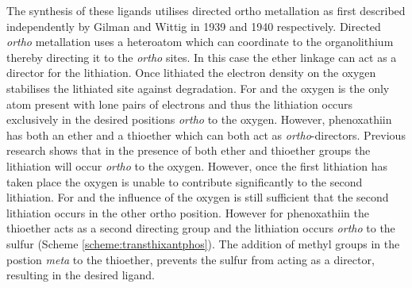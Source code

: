 {The synthesis of these ligands utilises directed ortho metallation as first described independently by Gilman and Wittig in 1939 and 1940 respectively.\cite{Gilman1939, Wittig1940} Directed \emph{ortho} metallation uses a heteroatom which can coordinate to the organolithium thereby directing it to the \emph{ortho} sites.  In this case the ether linkage can act as a director for the lithiation.  Once lithiated the electron density on the oxygen stabilises the lithiated site against degradation.  For \tBuxantphos{} and \tBusixantphos{} the oxygen is the only atom present with lone pairs of electrons and thus the lithiation occurs exclusively in the desired positions \emph{ortho} to the oxygen.  However, phenoxathiin has both an ether and a thioether which can both act as \emph{ortho}-directors.\cite{Organolithiummethods}  Previous research shows that in the presence of both ether and thioether groups the lithiation will occur \emph{ortho} to the oxygen.\cite{Turck1997}  However, once the first lithiation has taken place the oxygen is unable to contribute significantly to the second lithiation.  For \tBuxantphos{} and \tBusixantphos{} the influence of the oxygen is still sufficient that the second lithiation occurs in the other ortho position.  However for phenoxathiin the thioether acts as a second directing group and the lithiation occurs \emph{ortho} to the sulfur (Scheme \ref{scheme:transthixantphos}).  The addition of methyl groups in the postion \emph{meta} to the thioether, prevents the sulfur from acting as a director, resulting in the desired \tButhixantphos{} ligand.  


}

